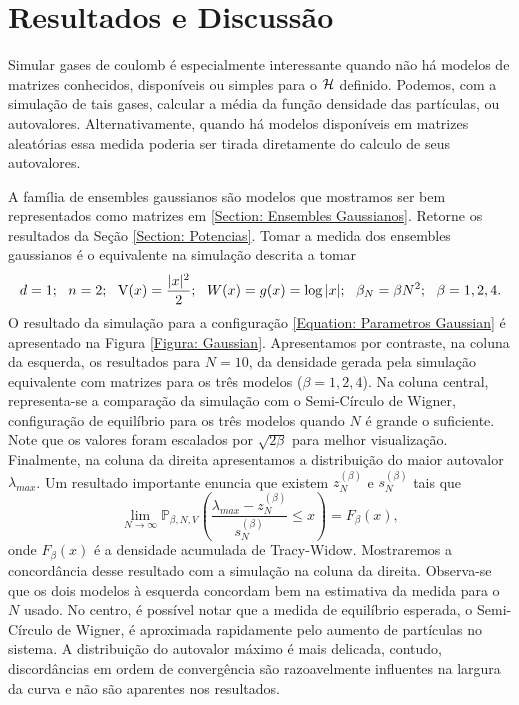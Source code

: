 \section{Resultados e Discussão}

Simular gases de coulomb é especialmente interessante quando não há modelos de matrizes conhecidos, disponíveis ou simples para o $\operatorname{\mathcal{H}}$ definido. Podemos, com a simulação de tais gases, calcular a média da função densidade das partículas, ou autovalores. Alternativamente, quando há modelos disponíveis em matrizes aleatórias essa medida poderia ser tirada diretamente do calculo de seus autovalores.

A família de ensembles gaussianos são modelos que mostramos ser bem representados como matrizes em \ref{Section: Ensembles Gaussianos}. Retorne os resultados da Seção \ref{Section: Potencias}. Tomar a medida dos ensembles gaussianos é o equivalente na simulação descrita a tomar 
\begin{equation}
d = 1; \ \  n = 2; \ \ \V(x)=\frac{|x|^2}{2}; \ \ W(x) = g(x) = \log{|x|}; \ \ \beta_N = \beta N^2; \ \ \beta = 1,2,4.
\label{Equation: Parametros Gaussian}
\end{equation}
O resultado da simulação para a configuração \ref{Equation: Parametros Gaussian} é apresentado na Figura \ref{Figura: Gaussian}. Apresentamos por contraste, na coluna da esquerda, os resultados para $N=10$, da densidade gerada pela simulação equivalente com matrizes para os três modelos ($\beta = 1,2,4$). Na coluna central, representa-se a comparação da simulação com o Semi-Círculo de Wigner, configuração de equilíbrio para os três modelos quando $N$ é grande o suficiente. Note que os valores foram escalados por $\sqrt{2 \beta}$ para melhor visualização. Finalmente, na coluna da direita apresentamos a distribuição do maior autovalor $\lambda_{max}$. Um resultado importante  \cite{Tracy} enuncia que existem $z_{N}^{(\beta)}$ e $s_N^{(\beta)}$ tais que $$\lim_{N \to \infty} \mathbb{P}_{\beta,N,V} \left( \frac{\lambda_{max} - z_{N}^{(\beta)}}{s_N^{(\beta)}} \leq x \right) = F_{\beta}(x),$$ onde $F_{\beta}(x)$ é a densidade acumulada de Tracy-Widow. Mostraremos a concordância desse resultado com a simulação na coluna da direita. Observa-se que os dois modelos à esquerda concordam bem na estimativa da medida para o $N$ usado. No centro, é possível notar que a medida de equilíbrio esperada, o Semi-Círculo de Wigner, é aproximada rapidamente pelo aumento de partículas no sistema. A distribuição do autovalor máximo é mais delicada, contudo, discordâncias em ordem de convergência são razoavelmente influentes na largura da curva e não são aparentes nos resultados.
